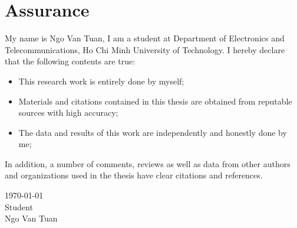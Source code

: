 \documentclass[\main/main.tex]{subfiles}
\begin{document}
\graphicspath{{imgs/}{00_misc/imgs/}}

\chapter*{Assurance}

My name is Ngo Van Tuan, I am a student at Department of Electronics and Telecommunications, Ho Chi Minh University of Technology.
\newline\newline
I hereby declare that the following contents are true:
\begin{itemize}
    \item This research work is entirely done by myself;
    \item Materials and citations contained in this thesis are obtained from reputable sources with high accuracy;
    \item The data and results of this work are independently and honestly done by me;
\end{itemize}

In addition, a number of comments, reviews as well as data from other authors and organizations used in the thesis have clear citations and references.

\begin{flushright}
    \parbox[t][4cm]{8cm}
    {   \centering
        \today\\
        Student\\
        \vspace{2cm}
        Ngo Van Tuan
    }
\end{flushright}
\end{document}
